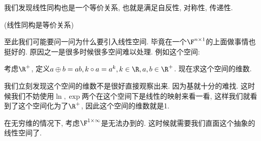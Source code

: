 我们发现线性同构也是一个等价关系, 也就是满足自反性, 对称性, 传递性. 
\begin{prop}
(线性同构是等价关系)
\end{prop}
至此我们可能要问一问为什么要引入线性空间. 毕竟在一个$\F^{n\times1}$的上面做事情也挺好的. 原因之一是很多时候很多空间难以处理.
例如这个空间:
\begin{example}
考虑$\R^{+}$, 定义$a\oplus b=ab,k\circ a=a^{k},k\in\R,a,b\in\R^{+}$.
现在求这个空间的维数. 
\end{example}
我们立刻发现这个空间的维数不是很好直接观察出来. 因为基就十分的难找. 这时候我们不妨使用$\ln,\exp$两个在这个空间下是线性的映射来看一看,
这样我们就看到了这个空间化为了$\R^{+}$, 因此这个空间的维数就是1. 

在无穷维的情况下, 考虑$\F^{1\times\infty}$是无法办到的. 这时候就需要我们直面这个抽象的线性空间了. 

